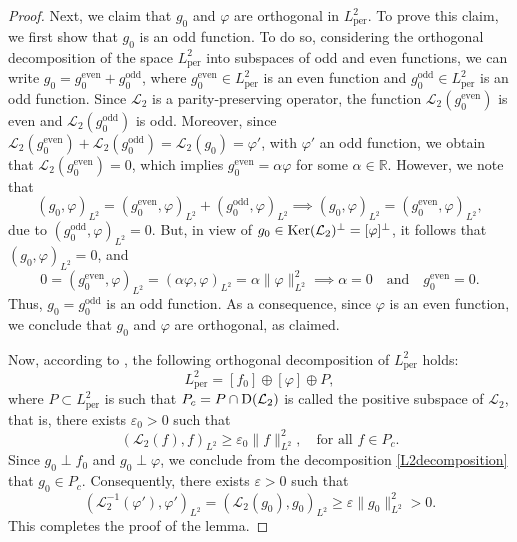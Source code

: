 \documentclass[10pt,reqno,a4paper]{amsart} %
\theoremstyle{definition} %
\numberwithin{equation}{section}
\numberwithin{figure}{section}
\begin{document}
\begin{proof}
Next, we claim that $g_0$ and $\varphi$ are orthogonal in $L^2_{\text{per}}$. To prove this claim, we first show that $g_0$ is an odd function. To do so, considering the orthogonal decomposition of the space $L^2_{\text{per}}$ into subspaces of odd and even functions, we can write $g_0 = g_0^{\text{even}} + g_0^{\text{odd}}$, where $g_0^{\text{even}} \in L^2_{\text{per}}$ is an even function and $g_0^{\text{odd}} \in L^2_{\text{per}}$ is an odd function. Since $\mathcal{L}_2$ is a parity-preserving operator, the function $\mathcal{L}_2(g_0^{\text{even}})$ is even and $\mathcal{L}_2(g_0^{\text{odd}})$ is odd. Moreover, since $\mathcal{L}_2(g_0^{\text{even}}) + \mathcal{L}_2(g_0^{\text{odd}}) = \mathcal{L}_2(g_0) = \varphi'$, with $\varphi'$ an odd function, we obtain that $\mathcal{L}_2(g_0^{\text{even}}) = 0$, which implies $g_0^{\text{even}} = \alpha \varphi$ for some $\alpha \in \mathbb{R}$. However, we note that
\[
(g_0, \varphi)_{L^2} = (g_0^{\text{even}}, \varphi)_{L^2} + (g_0^{\text{odd}}, \varphi)_{L^2} \implies (g_0, \varphi)_{L^2} = (g_0^{\text{even}}, \varphi)_{L^2},
\]
due to $(g_0^{\text{odd}}, \varphi)_{L^2} = 0$. But, in view of $g_0 \in {\rm Ker}(\mathcal{L}_2)^{\perp} = [\varphi]^{\perp}$, it follows that $(g_0, \varphi)_{L^2} = 0$, and
\[
0 = (g_0^{\text{even}}, \varphi)_{L^2} = (\alpha \varphi, \varphi)_{L^2} = \alpha \|\varphi\|_{L^2}^2 \implies \alpha = 0 \quad \text{and} \quad g_0^{\text{even}} = 0.
\]
Thus, $g_0 = g_0^{\text{odd}}$ is an odd function. As a consequence, since $\varphi$ is an even function, we conclude that $g_0$ and $\varphi$ are orthogonal, as claimed.

Now, according to \cite[page 96]{AnguloBook}, the following orthogonal decomposition of $L^2_{\text{per}}$ holds:
\begin{equation}\label{L2decomposition}
L^2_{\text{per}} = [f_0] \oplus [\varphi] \oplus P,
\end{equation}
where $P \subset L^2_{\text{per}}$ is such that $P_c = P \cap {\rm D}(\mathcal{L}_2)$ is called the positive subspace of $\mathcal{L}_2$, that is, there exists $\varepsilon_0 > 0$ such that
\[
(\mathcal{L}_2(f), f)_{L^2} \geq \varepsilon_0 \|f\|_{L^2}^2, \quad \text{for all } f \in P_c.
\]
Since $g_0 \perp f_0$ and $g_0 \perp \varphi$, we conclude from the decomposition \eqref{L2decomposition} that $g_0 \in P_c$. Consequently, there exists $\varepsilon > 0$ such that
\[
(\mathcal{L}_2^{-1}(\varphi'), \varphi')_{L^2} = (\mathcal{L}_2(g_0), g_0)_{L^2} \geq \varepsilon \|g_0\|_{L^2}^2 > 0.
\]
This completes the proof of the lemma.
\end{proof}
\end{document}
